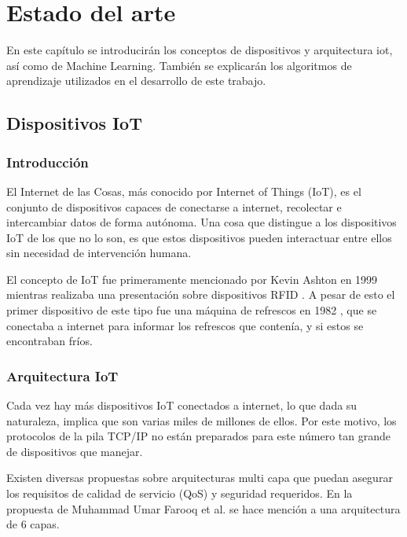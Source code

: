 
\chapter{Estado del arte} \label{chap:art}

En este capítulo se introducirán los conceptos de dispositivos y arquitectura \acrshort{iot}, así como de Machine Learning. También se explicarán los algoritmos de aprendizaje utilizados en el desarrollo de este trabajo.

\section{Dispositivos IoT}

\subsection{Introducción}

El Internet de las Cosas, más conocido por Internet of Things (IoT), es el conjunto de  dispositivos capaces de conectarse a internet, recolectar e intercambiar datos de forma autónoma. Una cosa que distingue a los dispositivos IoT de los que no lo son, es que estos dispositivos pueden interactuar entre ellos sin necesidad de intervención humana.

El concepto de IoT fue primeramente mencionado por Kevin Ashton en 1999 mientras realizaba una presentación sobre dispositivos RFID \cite{gokhale2018introduction}. A pesar de esto el primer dispositivo de este tipo fue una máquina de refrescos en 1982 \cite{cokemachine1982iot}, que se conectaba a internet para informar los refrescos que contenía, y si estos se encontraban fríos.

\subsection{Arquitectura IoT}

Cada vez hay más dispositivos IoT conectados a internet, lo que dada su naturaleza, implica que son varias miles de millones de ellos. Por este motivo, los protocolos de la pila TCP/IP no están preparados para este número tan grande de dispositivos que manejar.

Existen diversas propuestas sobre arquitecturas multi capa que puedan asegurar los requisitos de calidad de servicio (QoS) y seguridad requeridos. En la propuesta de Muhammad Umar Farooq et al. \cite{farooq2015review} se hace mención a una arquitectura de 6 capas.

